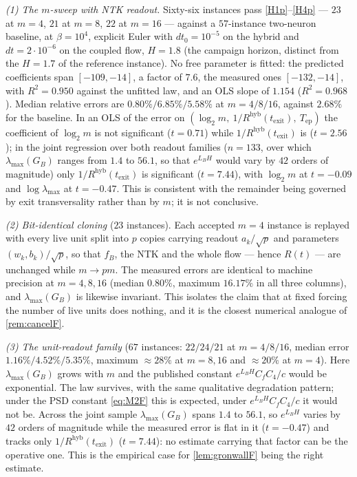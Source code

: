 \documentclass[11pt]{article}
\theoremstyle{definition}
\theoremstyle{remark}
\newcommand{\texit}{t_{\mathrm{exit}}}
\newcommand{\Tep}{T_{\mathrm{ep}}}   %
\newcommand{\hyb}{\mathrm{hyb}}
\begin{document}
\emph{(1) The $m$-sweep with NTK readout.} Sixty-six instances pass
\eqref{H1p}--\eqref{H4p} --- $23$ at $m=4$, $21$ at $m=8$, $22$ at $m=16$ --- against a
$57$-instance two-neuron baseline, at $\beta=10^4$, explicit Euler with
$dt_0=10^{-5}$ on the hybrid and $dt=2\cdot10^{-6}$ on the coupled flow,
$H=1.8$ (the campaign horizon, distinct from the $H=1.7$ of the reference
instance). No free parameter is fitted: the predicted coefficients span
$[-109,-14]$, a factor of $7.6$, the measured ones $[-132,-14]$, with
$R^2=0.950$ against the unfitted law, and an OLS slope of $1.154$
($R^2=0.968$). Median relative errors are
$0.80\%/6.85\%/5.58\%$ at $m=4/8/16$, against $2.68\%$ for the baseline. In an
OLS of the error on $(\log_2m,\ 1/R^{\hyb}(\texit),\ \Tep)$ the coefficient of
$\log_2m$ is not significant ($t=0.71$) while $1/R^{\hyb}(\texit)$ is
($t=2.56$); in the joint regression over both readout families ($n=133$, over
which $\lambda_{\max}(G_B)$ ranges from $1.4$ to $56.1$, so that $e^{L_BH}$
would vary by $42$ orders of magnitude) only $1/R^{\hyb}(\texit)$ is significant
($t=7.44$), with $\log_2m$ at $t=-0.09$ and $\log\lambda_{\max}$ at $t=-0.47$.
This is consistent with the remainder being governed by exit transversality
rather than by $m$; it is not conclusive.

\emph{(2) Bit-identical cloning} ($23$ instances). Each accepted $m=4$ instance
is replayed with every live unit split into $p$ copies carrying readout
$a_k/\sqrt p$ and parameters $(w_k,b_k)/\sqrt p$, so that $f_B$, the NTK and the
whole flow --- hence $R(t)$ --- are unchanged while $m\to pm$. The measured
errors are identical to machine precision at $m=4,8,16$ (median $0.80\%$,
maximum $16.17\%$ in all three columns), and $\lambda_{\max}(G_B)$ is likewise
invariant. This isolates the claim that at fixed forcing the number of live
units does nothing, and it is the closest numerical analogue of
\cref{rem:cancelF}.

\emph{(3) The unit-readout family} ($67$ instances: $22/24/21$ at $m=4/8/16$,
median error $1.16\%/4.52\%/5.35\%$, maximum $\approx28\%$ at $m=8,16$ and
$\approx20\%$ at $m=4$). Here
$\lambda_{\max}(G_B)$ grows with $m$ and the published constant
$e^{L_BH}C_fC_4/c$ would be exponential. The law survives, with the same
qualitative degradation pattern; under the PSD constant \eqref{eq:M2F} this is
expected, under $e^{L_BH}C_fC_4/c$ it would not be. Across the joint sample
$\lambda_{\max}(G_B)$ spans $1.4$ to $56.1$, so $e^{L_BH}$ varies by $42$
orders of magnitude while the measured error is flat in it ($t=-0.47$) and
tracks only $1/R^{\hyb}(\texit)$ ($t=7.44$): no estimate carrying that factor
can be the operative one. This is the empirical case for \cref{lem:gronwallF}
being the right estimate.
\end{document}
